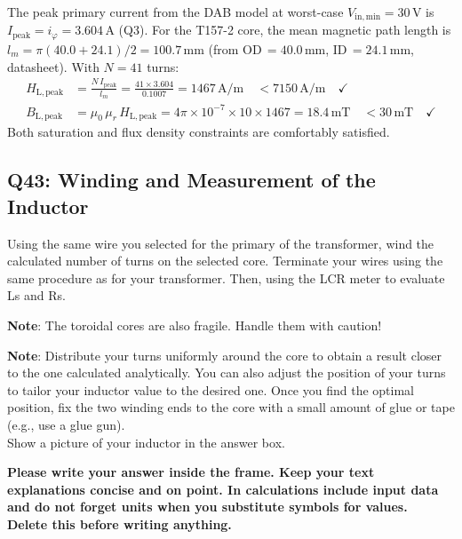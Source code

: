 \documentclass{PELsmallreport}
\begin{document}
\begin{framed}
The peak primary current from the DAB model at worst-case $V_\mathrm{in,min}=30\,\mathrm{V}$ is $I_\mathrm{peak} = i_\varphi = 3.604\,\mathrm{A}$ (Q3). For the T157-2 core, the mean magnetic path length is $l_m = \pi(40.0+24.1)/2 = 100.7\,\mathrm{mm}$ (from OD$\,=40.0\,\mathrm{mm}$, ID$\,=24.1\,\mathrm{mm}$, datasheet). With $N=41$ turns:
\begin{align}
    H_\mathrm{L,peak} &= \frac{N\,I_\mathrm{peak}}{l_m} = \frac{41\times3.604}{0.1007} = 1467\,\mathrm{A/m} \quad < 7150\,\mathrm{A/m} \quad\checkmark\\
    B_\mathrm{L,peak} &= \mu_0\,\mu_r\,H_\mathrm{L,peak} = 4\pi\!\times\!10^{-7}\times10\times1467 = 18.4\,\mathrm{mT} \quad < 30\,\mathrm{mT} \quad\checkmark
\end{align}
Both saturation and flux density constraints are comfortably satisfied.
\end{framed}

 \qquad
{} \hfill{}









\subsection{Q43: Winding and Measurement of the Inductor}
Using the same wire you selected for the primary of the transformer, wind the calculated number of turns on the selected core. 
Terminate your wires using the same procedure as for your transformer. 
Then, using the LCR meter to evaluate Ls and Rs. 

\textbf{Note}: The toroidal cores are also fragile. Handle them with caution!  

\textbf{Note}: Distribute your turns uniformly around the core to obtain a result closer to the one calculated analytically. 
You can also adjust the position of your turns to tailor your inductor value to the desired one. 
Once you find the optimal position, fix the two winding ends to the core with a small amount of glue or tape (e.g., use a glue gun). 
\\
Show a picture of your inductor in the answer box.

\begin{framed}
	\vspace{2em}
	\textbf{Please write your answer inside the frame. Keep your text explanations concise and on point. In calculations include input data and do not forget units when you substitute symbols for values. \\ Delete this before writing anything.}
	\vspace{2em}
\end{framed}
\end{document}
